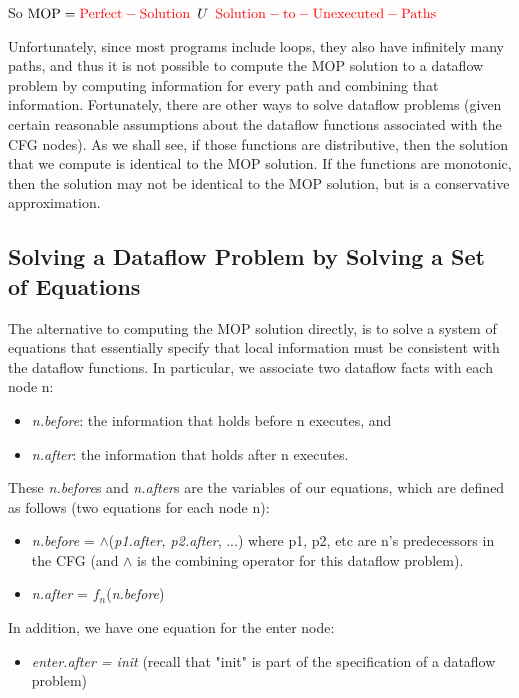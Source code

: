 So $\mathrm{MOP} = {\color{red}\mathrm{Perfect-Solution   }} \,\,\,U\,\,\, {\color{red}\mathrm{   Solution-to-Unexecuted-Paths}}$

Unfortunately, since most programs include loops, they also have infinitely many paths, and thus it is not possible to
compute the MOP solution to a dataflow problem by computing information for every path and combining that information. Fortunately,
there are other ways to solve dataflow problems (given certain reasonable assumptions about the dataflow functions associated with
the CFG nodes). As we shall see, if those functions are distributive, then the solution that we compute is identical to the MOP
solution. If the functions are monotonic, then the solution may not be identical to the MOP solution, but is a conservative
approximation.

\subsection{Solving a Dataflow Problem by Solving a Set of Equations}

The alternative to computing the MOP solution directly, is to solve a system of equations
that essentially specify that local information must be consistent with the dataflow functions.
In particular, we associate two dataflow facts with each node n:
\begin{itemize}
	\item \textit{n.before}: the information that holds before n executes, and
	\item \textit{n.after}: the information that holds after n executes.
\end{itemize}

These \textit{n.before}s and \textit{n.after}s are the variables of our equations,
which are defined as follows (two equations for each node n):


\begin{itemize}
	\item \textit{n.before} = $\wedge$(\textit{p1.after, p2.after}, ...)
	      where p1, p2, etc are n's predecessors in the CFG (and $\wedge$ is the
	      combining operator for this dataflow problem).
	\item \textit{n.after} = $f_n$(\textit{n.before})
\end{itemize}

In addition, we have one equation for the enter node:

\begin{itemize}

	\item \textit{enter.after = init} (recall that "init" is part of the specification of a dataflow problem)
\end{itemize}

